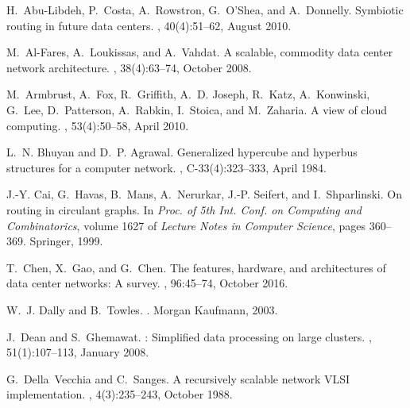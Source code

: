 \documentclass[]{amsart}
\begin{document}
{\FloatBarrier



\begin{thebibliography}{10}

H.~Abu-Libdeh, P.~Costa, A.~Rowstron, G.~O'Shea, and A.~Donnelly.
\newblock Symbiotic routing in future data centers.
, 40(4):51--62, August
  2010.

M.~Al-Fares, A.~Loukissas, and A.~Vahdat.
\newblock A scalable, commodity data center network architecture.
, 38(4):63--74, October
  2008.

M.~Armbrust, A.~Fox, R.~Griffith, A.~D. Joseph, R.~Katz, A.~Konwinski, G.~Lee,
  D.~Patterson, A.~Rabkin, I.~Stoica, and M.~Zaharia.
\newblock A view of cloud computing.
, 53(4):50--58, April 2010.

L.~N. Bhuyan and D.~P. Agrawal.
\newblock Generalized hypercube and hyperbus structures for a computer network.
, C-33(4):323--333, April 1984.

J.-Y. Cai, G.~Havas, B.~Mans, A.~Nerurkar, J.-P. Seifert, and I.~Shparlinski.
\newblock On routing in circulant graphs.
\newblock In {\em Proc. of 5th Int. Conf. on Computing and Combinatorics},
  volume 1627 of {\em Lecture Notes in Computer Science}, pages 360--369.
  Springer, 1999.

T.~Chen, X.~Gao, and G.~Chen.
\newblock The features, hardware, and architectures of data center networks: A
  survey.
, 96:45--74,
  October 2016.

W.~J. Dally and B.~Towles.
.
\newblock Morgan Kaufmann, 2003.

J.~Dean and S.~Ghemawat.
: Simplified data processing on large clusters.
, 51(1):107--113, January 2008.

G.~Della~Vecchia and C.~Sanges.
\newblock A recursively scalable network {VLSI} implementation.
, 4(3):235--243, October
  1988.


\end{thebibliography}}
\end{document}
